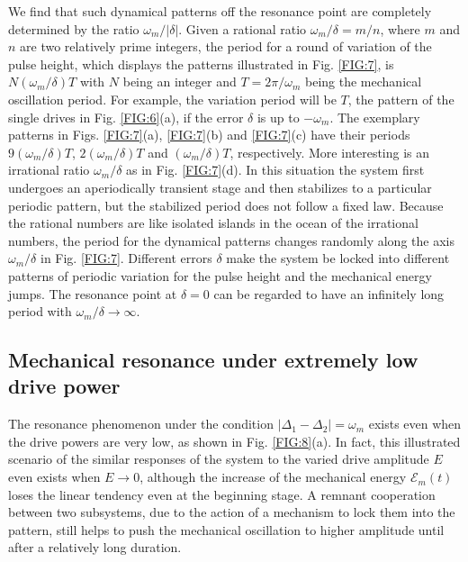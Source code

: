 \documentclass[a4paper,fleqn]{cas-dc}
\begin{document}
We find that such dynamical patterns off the resonance point are completely determined by the ratio $\omega_m/|\delta|$. Given a rational ratio $\omega_m/\delta=m/n$, where $m$ and $n$ are two relatively prime integers, the period for a round of variation of the pulse height, which displays the patterns illustrated in Fig. \ref{FIG:7}, is $N(\omega_m/\delta)T$ with $N$ being an integer and $T=2\pi/\omega_m$ being the mechanical oscillation period. For example, the variation period will be $T$, the pattern of the single drives in Fig. \ref{FIG:6}(a), if the error $\delta$ is 
up to $-\omega_m$. The exemplary patterns in Figs. \ref{FIG:7}(a), \ref{FIG:7}(b) and \ref{FIG:7}(c) have their periods $9(\omega_m/\delta)T$, $2(\omega_m/\delta)T$ and $(\omega_m/\delta)T$, respectively. More interesting is an irrational ratio $\omega_m/\delta$ as in Fig. \ref{FIG:7}(d). In this situation the system first undergoes an aperiodically transient stage and then stabilizes to a particular periodic pattern, but the stabilized period does not follow a fixed law. Because the rational numbers are like isolated islands in the ocean of the irrational numbers, the period for the dynamical patterns changes randomly along the axis $\omega_m/\delta$ in Fig. \ref{FIG:7}. Different errors $\delta$ make the system be locked into different patterns of periodic variation for the pulse height and the mechanical energy jumps. The resonance point at $\delta=0$ can be regarded to have an infinitely long period with $\omega_m/\delta\rightarrow \infty$.

\subsection{Mechanical resonance under extremely low drive power}

The resonance phenomenon under the condition $|\Delta_1-\Delta_2|=\omega_m$ exists even when the drive powers are very low, as shown in Fig. \ref{FIG:8}(a). In fact, this illustrated scenario of the similar responses of the system to the varied drive amplitude $E$ even exists when $E\rightarrow 0$, although the increase of the mechanical energy $\mathcal{E}_m(t)$ loses the linear tendency even at the beginning stage. A remnant cooperation between two subsystems, due to the action of a mechanism to lock them into the pattern, still helps to push the mechanical oscillation to higher amplitude until after a relatively long duration. 
\end{document}
